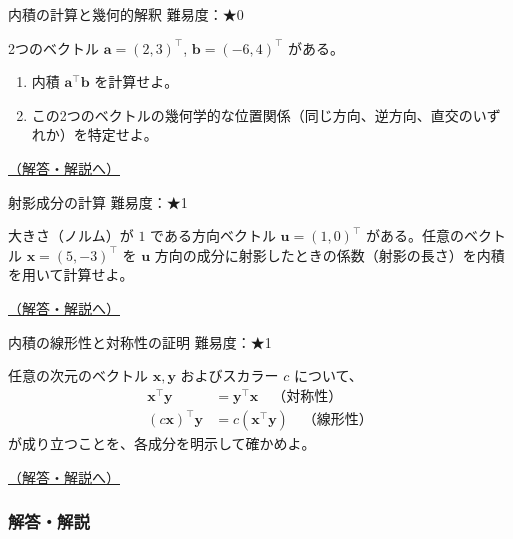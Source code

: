 \begin{questionbox}[label=q:3-1-1]{内積の計算と幾何的解釈 \hfill \normalfont \small 難易度：★0}

2つのベクトル \(\mathbf{a} = (2, 3)^\top\),
\(\mathbf{b} = (-6, 4)^\top\) がある。

\begin{enumerate}
\def\labelenumi{\arabic{enumi}.}
\tightlist
\item
  内積 \(\mathbf{a}^\top \mathbf{b}\) を計算せよ。
\item
  この2つのベクトルの幾何学的な位置関係（同じ方向、逆方向、直交のいずれか）を特定せよ。
\end{enumerate}

\hfill 

\hyperref[a:3-1-1]{（解答・解説へ）}

\end{questionbox}

\begin{questionbox}[label=q:3-1-2]{射影成分の計算 \hfill \normalfont \small 難易度：★1}

大きさ（ノルム）が \(1\) である方向ベクトル \(\mathbf{u} = (1, 0)^\top\)
がある。任意のベクトル \(\mathbf{x} = (5, -3)^\top\) を \(\mathbf{u}\)
方向の成分に射影したときの係数（射影の長さ）を内積を用いて計算せよ。

\hfill 

\hyperref[a:3-1-2]{（解答・解説へ）}

\end{questionbox}

\begin{questionbox}[label=q:3-1-3]{内積の線形性と対称性の証明 \hfill \normalfont \small 難易度：★1}

任意の次元のベクトル \(\mathbf{x}, \mathbf{y}\) およびスカラー \(c\)
について、 \begin{align*}
\mathbf{x}^\top \mathbf{y} &= \mathbf{y}^\top \mathbf{x} \quad \text{（対称性）} \\
(c\mathbf{x})^\top \mathbf{y} &= c(\mathbf{x}^\top \mathbf{y}) \quad \text{（線形性）}
\end{align*} が成り立つことを、各成分を明示して確かめよ。

\hfill 

\hyperref[a:3-1-3]{（解答・解説へ）}

\end{questionbox}

\subsubsection{解答・解説}\label{ux89e3ux7b54ux89e3ux8aac-5}

